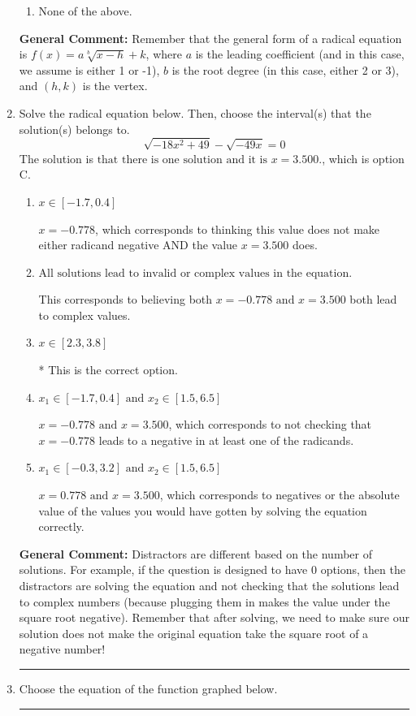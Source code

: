 \documentclass{extbook}[14pt]
\newcommand{\litem}[1]{\item #1

\rule{\textwidth}{0.4pt}}
\begin{document}
\begin{enumerate}
{\begin{enumerate}[label=\Alph*.]
\item None of the above.\end{enumerate}
\textbf{General Comment:} Remember that the general form of a radical equation is $ f(x) = a \sqrt[b]{x - h} + k $, where $a$ is the leading coefficient (and in this case, we assume is either 1 or -1), $b$ is the root degree (in this case, either 2 or 3), and $(h, k)$ is the vertex.
}
\litem{
Solve the radical equation below. Then, choose the interval(s) that the solution(s) belongs to.
\[ \sqrt{-18 x^2 + 49} - \sqrt{-49 x} = 0 \]The solution is \( \text{that there is one solution and it is } x = 3.500. \), which is option C.\begin{enumerate}[label=\Alph*.]
\item \( x \in [-1.7,0.4] \)

$x = -0.778$, which corresponds to thinking this value does not make either radicand negative AND the value $x = 3.500$ does.
\item \( \text{All solutions lead to invalid or complex values in the equation.} \)

This corresponds to believing both $x = -0.778 \text{ and } x = 3.500$ both lead to complex values.
\item \( x \in [2.3,3.8] \)

* This is the correct option.
\item \( x_1 \in [-1.7, 0.4] \text{ and } x_2 \in [1.5,6.5] \)

$x = -0.778 \text{ and } x = 3.500$, which corresponds to not checking that $x = -0.778$ leads to a negative in at least one of the radicands.
\item \( x_1 \in [-0.3, 3.2] \text{ and } x_2 \in [1.5,6.5] \)

$x = 0.778 \text{ and } x = 3.500$, which corresponds to negatives or the absolute value of the values you would have gotten by solving the equation correctly.
\end{enumerate}

\textbf{General Comment:} Distractors are different based on the number of solutions. For example, if the question is designed to have 0 options, then the distractors are solving the equation and not checking that the solutions lead to complex numbers (because plugging them in makes the value under the square root negative). Remember that after solving, we need to make sure our solution does not make the original equation take the square root of a negative number!
}
\litem{
Choose the equation of the function graphed below.

}
\end{enumerate}
\end{document}
